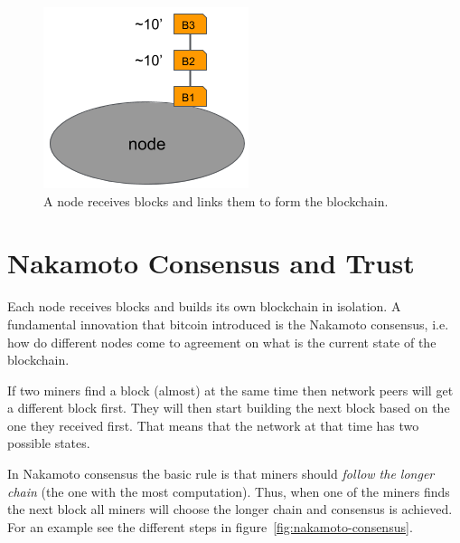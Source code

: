 \begin{figure}[h]
\begin{center}
\includegraphics[scale=0.5]{images/node-perspective-2}
\caption{A node receives blocks and links them to form the blockchain.}
\label{fig:node-perspective-2}
\end{center}
\end{figure}


\section{Nakamoto Consensus and Trust}
Each node receives blocks and builds its own blockchain in isolation. A fundamental innovation that bitcoin introduced is the Nakamoto consensus, i.e. how do different nodes come to agreement on what is the current state of the blockchain.

If two miners find a block (almost) at the same time then network peers will get a different block first. They will then start building the next block based on the one they received first. That means that the network at that time has two possible states.

In Nakamoto consensus the basic rule is that miners should \emph{follow the longer chain} (the one with the most computation). Thus, when one of the miners finds the next block all miners will choose the longer chain and consensus is achieved. For an example see the different steps in figure~\ref{fig:nakamoto-consensus}.

